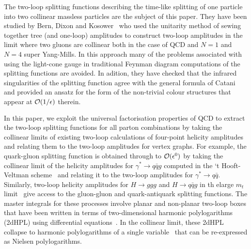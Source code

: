 \documentclass[paper,notoc,nohyper]{JHEP3}
\begin{document}
The two-loop splitting functions describing the time-like splitting of one
particle into two collinear massless particles are the subject of this paper.
They have been studied by Bern, Dixon and Kosower~\cite{Bern:2lsplit} who used
the unitarity method of sewing together tree (and one-loop) amplitudes to
construct two-loop amplitudes in the limit where two gluons are collinear both
in the case of QCD and $N=1$ and $N=4$ super Yang-Mills.  In this
approach many of the problems associated with using the light-cone gauge in
traditional Feynman diagram computations of the splitting functions are
avoided. In adition, they have checked that the infrared singularities of
the splitting function agree with the general formula of Catani~\cite{Catani:polestruc,Sterman:multi} and 
provided an ansatz for the form of the non-trivial colour
structures that appear at  ${\cal O}(1/\epsilon)$ therein.



In this paper, we exploit the universal factorisation properties of QCD to
extract the two-loop splitting functions for all parton combinations by taking
the collinear limits of existing two-loop calculations of four-point
helicity
amplitudes~\cite{Berends:hels,DeCausmaecker:hels,Gunion:hels,Xu:hels,Berends:w-vdw} 
and relating them to the two-loop amplitudes for vertex graphs. 
For example, the quark-gluon splitting function is obtained through to  ${\cal
O}(\epsilon^0)$ by taking the collinear limit of the helicity amplitudes for 
$\gamma^* \to q\bar q g$ computed in the `t Hooft-Veltman scheme~\cite{'tHooft:renorm}  and
relating it to the two-loop amplitudes for $\gamma^* \to q\bar q$.  
Similarly, two-loop helicity amplitudes for  $H\to ggg$ and $H \to q\bar q
g$ in th elarge $m_t$ limit~\cite{inprep} give access to the gluon-gluon and quark-antiquark
splitting functions.  The master integrals for these processes involve planar and
non-planar two-loop boxes that have been written in terms of two-dimensional harmonic
polylogarithms~\cite{Gehrmann:3jplanar,Gehrmann:3jnonplanar} (2dHPL) using differential
equations~\cite{Gehrmann:diffeqs}.  In the collinear limit, these 2dHPL collapse
to harmonic polylogarithms of a single variable~\cite{Remiddi:HPL} that can be re-expressed as
Nielsen polylogarithms.
\end{document}
